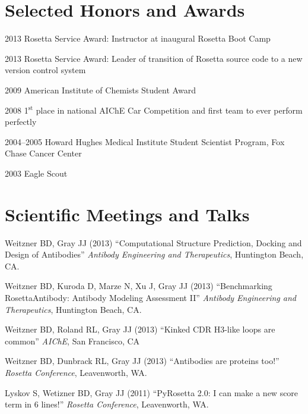 \documentclass[12pt]{scrartcl}
\begin{document}
\section{\lsstyle Selected Honors and Awards}
\begin{CV}
\item[2013] Rosetta Service Award: Instructor at inaugural Rosetta Boot Camp
\item[2013] Rosetta Service Award: Leader of transition of Rosetta source code to a new version control system
\item[2009] American Institute of Chemists Student Award
\item[2008] 1$^\text{st}$ place in national AIChE Car Competition and first team to ever perform perfectly
\item[2004--2005] Howard Hughes Medical Institute Student Scientist Program, Fox Chase Cancer Center
\item[2003] Eagle Scout
\end{CV}

\pagebreak
\section{\lsstyle Scientific Meetings and Talks}
\noindent Weitzner BD, Gray JJ (2013) ``Computational Structure Prediction, Docking and Design of Antibodies'' \textit{Antibody Engineering and Therapeutics}, Huntington Beach, CA.

\vspace{0.75\baselineskip}

\noindent Weitzner BD, Kuroda D, Marze N, Xu J, Gray JJ (2013) ``Benchmarking RosettaAntibody: Antibody Modeling Assessment II'' \textit{Antibody Engineering and Therapeutics}, Huntington Beach, CA.

\vspace{0.75\baselineskip}

\noindent Weitzner BD, Roland RL, Gray JJ (2013) ``Kinked CDR H3-like loops are common'' \textit{AIChE}, San Francisco, CA

\vspace{0.75\baselineskip}

\noindent Weitzner BD, Dunbrack RL, Gray JJ (2013) ``Antibodies are proteins too!'' \textit{Rosetta Conference}, Leavenworth, WA.

\vspace{0.75\baselineskip}

\noindent Lyskov S, Wetizner BD, Gray JJ (2011) ``PyRosetta 2.0: I can make a new score term in 6 lines!'' \textit{Rosetta Conference}, Leavenworth, WA.
\end{document}
